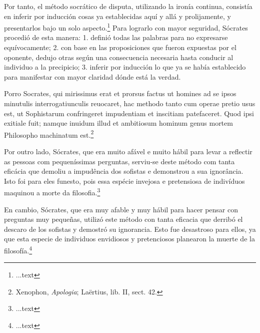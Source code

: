 \documentclass{article}
\begin{document}
\begin{paracol}{3}
  \vspace{0.5cm}
  \begin{nthcolumn}{2} %
    Por tanto, el método socrático de disputa, utilizando la ironía continua,
consistía en inferir por inducción cosas ya establecidas aquí y allá y prolijamente, y presentarlos bajo un solo aspecto.\footnote[19]{...text} Para lograrlo con mayor seguridad, Sócrates procedió de esta manera: 1. definió todas las palabras para no expresarse equívocamente; 2. con base en las proposiciones que fueron expuestas por el oponente, dedujo otras según una consecuencia necesaria hasta conducir al individuo a la precipicio; 3. inferir por inducción lo que ya se había establecido para manifestar con mayor claridad dónde está la verdad.
  \end{nthcolumn}
  \vspace{0.5cm}
  \begin{nthcolumn*}{0} %
    Porro Socrates, qui mirissimus erat et prorsus factus ut homines ad se ipsos minutulis interrogatiunculis reuocaret, hac methodo tanto cum operae pretio usus est, ut Sophistarum confringeret impudentiam et inscitiam patefaceret. Quod ipsi exitiale fuit; namque inuidum illud et ambitiosum hominum genus mortem Philosopho machinatum est.\footnote[20]{Xenophon, \emph{Apologia}; Laërtius, lib. II, sect. 42.}
  \end{nthcolumn*}
  \vspace{0.5cm}
  \begin{nthcolumn}{1} %
    Por outro lado, Sócrates, que era muito afável e muito hábil para levar a reflectir as pessoas com pequeníssimas perguntas, serviu-se deste método com tanta eficácia que demoliu a impudência dos sofistas e demonstrou a sua ignorância. Isto foi para eles funesto, pois essa espécie invejosa e pretensiosa de indivíduos maquinou a morte da filosofia.\footnote[20]{...text}
  \end{nthcolumn}
  \vspace{0.5cm}
  \begin{nthcolumn}{2} %
    En cambio, Sócrates, que era muy afable y muy hábil para hacer pensar con preguntas muy pequeñas, utilizó este método con tanta eficacia que derribó el descaro de los sofistas y demostró su ignorancia. Esto fue desastroso para ellos, ya que esta especie de individuos envidiosos y pretenciosos planearon la muerte de la filosofía.\footnote[20]{...text}
  \end{nthcolumn}
  \vspace{0.5cm}
  \begin{nthcolumn*}{0} %

\end{nthcolumn*}
\end{paracol}
\end{document}
